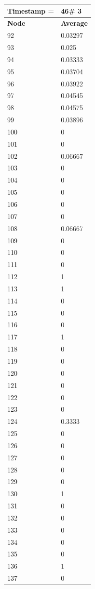 \begin{tabular}{|l||l|}
\hline
\textbf{Timestamp =} & \textbf{46}\# 3\\\hline
	\textbf{Node} & \textbf{Average} \\ \hline
\hline
	92 & 0.03297 \\ \hline
	93 & 0.025 \\ \hline
	94 & 0.03333 \\ \hline
	95 & 0.03704 \\ \hline
	96 & 0.03922 \\ \hline
	97 & 0.04545 \\ \hline
	98 & 0.04575 \\ \hline
	99 & 0.03896 \\ \hline
	100 & 0 \\ \hline
	101 & 0 \\ \hline
	102 & 0.06667 \\ \hline
	103 & 0 \\ \hline
	104 & 0 \\ \hline
	105 & 0 \\ \hline
	106 & 0 \\ \hline
	107 & 0 \\ \hline
	108 & 0.06667 \\ \hline
	109 & 0 \\ \hline
	110 & 0 \\ \hline
	111 & 0 \\ \hline
	112 & 1 \\ \hline
	113 & 1 \\ \hline
	114 & 0 \\ \hline
	115 & 0 \\ \hline
	116 & 0 \\ \hline
	117 & 1 \\ \hline
	118 & 0 \\ \hline
	119 & 0 \\ \hline
	120 & 0 \\ \hline
	121 & 0 \\ \hline
	122 & 0 \\ \hline
	123 & 0 \\ \hline
	124 & 0.3333 \\ \hline
	125 & 0 \\ \hline
	126 & 0 \\ \hline
	127 & 0 \\ \hline
	128 & 0 \\ \hline
	129 & 0 \\ \hline
	130 & 1 \\ \hline
	131 & 0 \\ \hline
	132 & 0 \\ \hline
	133 & 0 \\ \hline
	134 & 0 \\ \hline
	135 & 0 \\ \hline
	136 & 1 \\ \hline
	137 & 0 \\ \hline
\end{tabular}

